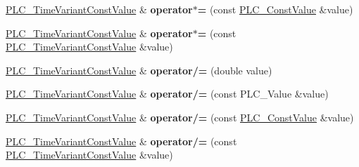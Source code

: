 \begin{DoxyCompactItemize}
\item 
\hypertarget{classns3_1_1PLC__TimeVariantConstValue_a62b3c4c433a468ed9b4e7509fa349eff}{\hyperlink{classns3_1_1PLC__TimeVariantConstValue}{\-P\-L\-C\-\_\-\-Time\-Variant\-Const\-Value} \& {\bfseries operator$\ast$=} (const \hyperlink{classns3_1_1PLC__ConstValue}{\-P\-L\-C\-\_\-\-Const\-Value} \&value)}\label{classns3_1_1PLC__TimeVariantConstValue_a62b3c4c433a468ed9b4e7509fa349eff}

\item 
\hypertarget{classns3_1_1PLC__TimeVariantConstValue_a2bbdc14fb02bda82bf7f274b269ec104}{\hyperlink{classns3_1_1PLC__TimeVariantConstValue}{\-P\-L\-C\-\_\-\-Time\-Variant\-Const\-Value} \& {\bfseries operator$\ast$=} (const \hyperlink{classns3_1_1PLC__TimeVariantConstValue}{\-P\-L\-C\-\_\-\-Time\-Variant\-Const\-Value} \&value)}\label{classns3_1_1PLC__TimeVariantConstValue_a2bbdc14fb02bda82bf7f274b269ec104}

\item 
\hypertarget{classns3_1_1PLC__TimeVariantConstValue_a3f51ce9a0c95a2aa750e1fc59791dc19}{\hyperlink{classns3_1_1PLC__TimeVariantConstValue}{\-P\-L\-C\-\_\-\-Time\-Variant\-Const\-Value} \& {\bfseries operator/=} (double value)}\label{classns3_1_1PLC__TimeVariantConstValue_a3f51ce9a0c95a2aa750e1fc59791dc19}

\item 
\hypertarget{classns3_1_1PLC__TimeVariantConstValue_a7827b4d77cef2d97a53db346feda7162}{\hyperlink{classns3_1_1PLC__TimeVariantConstValue}{\-P\-L\-C\-\_\-\-Time\-Variant\-Const\-Value} \& {\bfseries operator/=} (const \-P\-L\-C\-\_\-\-Value \&value)}\label{classns3_1_1PLC__TimeVariantConstValue_a7827b4d77cef2d97a53db346feda7162}

\item 
\hypertarget{classns3_1_1PLC__TimeVariantConstValue_a8cde3d9c37a6c18cbdf38c029c27a158}{\hyperlink{classns3_1_1PLC__TimeVariantConstValue}{\-P\-L\-C\-\_\-\-Time\-Variant\-Const\-Value} \& {\bfseries operator/=} (const \hyperlink{classns3_1_1PLC__ConstValue}{\-P\-L\-C\-\_\-\-Const\-Value} \&value)}\label{classns3_1_1PLC__TimeVariantConstValue_a8cde3d9c37a6c18cbdf38c029c27a158}

\item 
\hypertarget{classns3_1_1PLC__TimeVariantConstValue_ac8ef060fc004e4cbf323820ac8a14f9b}{\hyperlink{classns3_1_1PLC__TimeVariantConstValue}{\-P\-L\-C\-\_\-\-Time\-Variant\-Const\-Value} \& {\bfseries operator/=} (const \hyperlink{classns3_1_1PLC__TimeVariantConstValue}{\-P\-L\-C\-\_\-\-Time\-Variant\-Const\-Value} \&value)}\label{classns3_1_1PLC__TimeVariantConstValue_ac8ef060fc004e4cbf323820ac8a14f9b}

\end{DoxyCompactItemize}
